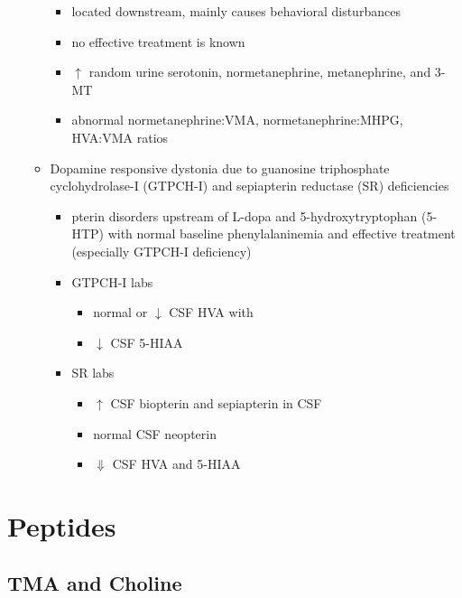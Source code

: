 \documentclass{scrartcl}
\begin{document}
\begin{itemize}
\begin{itemize}
\begin{itemize}
\item located downstream, mainly causes behavioral disturbances
\item no effective treatment is known
\item \(\uparrow\) random urine serotonin, normetanephrine, metanephrine, and 3-MT
\item abnormal normetanephrine:VMA, normetanephrine:MHPG, HVA:VMA ratios
\end{itemize}
\item Dopamine responsive dystonia due to guanosine triphosphate cyclohydrolase-I (GTPCH-I) and
sepiapterin reductase (SR) deficiencies
\begin{itemize}
\item pterin disorders upstream of L-dopa and
5-hydroxytryptophan (5-HTP) with normal baseline
phenylalaninemia and effective treatment (especially GTPCH-I
deficiency)
\item GTPCH-I labs
\begin{itemize}
\item normal or \(\downarrow\) CSF HVA with
\item \(\downarrow\) CSF 5-HIAA
\end{itemize}
\item SR labs
\begin{itemize}
\item \(\uparrow\) CSF biopterin and sepiapterin in CSF
\item normal CSF neopterin
\item \(\Downarrow\) CSF HVA and 5-HIAA
\end{itemize}
\end{itemize}
\end{itemize}
\end{itemize}
\section{Peptides}
\label{sec:orgf4422d2}
\subsection{TMA and Choline}
\label{sec:orgd40e77b}
\end{document}
